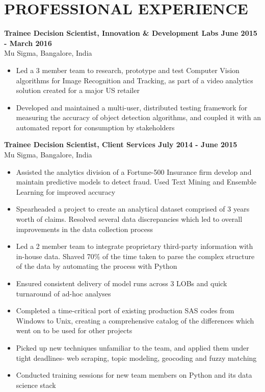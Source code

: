 \documentclass{article}
\begin{document}
\section*{PROFESSIONAL EXPERIENCE}
\noindent
\textbf{Trainee Decision Scientist, Innovation \& Development Labs \hfill June 2015 - March 2016}\\
Mu Sigma, Bangalore, India
\begin{itemize}
	\item Led a 3 member team to research, prototype and test Computer Vision
        algorithms for Image Recognition and Tracking, as part of a video analytics solution created for a major US retailer
	\item Developed and maintained a multi-user, distributed testing framework for measuring the accuracy of object
detection algorithms, and coupled it with an automated report for consumption by stakeholders
\end{itemize}
\textbf{Trainee Decision Scientist, Client Services \hfill July 2014 - June 2015}\\
Mu Sigma, Bangalore, India
\begin{itemize}
	\item Assisted the analytics division of a Fortune-500 Insurance firm develop and maintain predictive models to detect fraud. Used Text Mining and Ensemble Learning for improved accuracy
	\item Spearheaded a project to create an analytical dataset comprised of 3 years worth of claims. Resolved several data discrepancies which led to 
        overall improvements in the data collection process
    \item Led a 2 member team to integrate proprietary third-party information
        with in-house data. Shaved 70\% of the time taken to parse the complex
        structure of the data by automating the process with Python
	\item Ensured consistent delivery of model runs across 3 LOBs and quick turnaround of ad-hoc analyses
	\item Completed a time-critical port of existing production SAS codes from Windows to Unix, creating a
comprehensive catalog of the differences which went on to be used for other projects
	\item Picked up new techniques unfamiliar to the team, and applied them under tight deadlines- web scraping,
topic modeling, geocoding and fuzzy matching
	\item Conducted training sessions for new team members on Python and its data science stack
\end{itemize}
\end{document}
